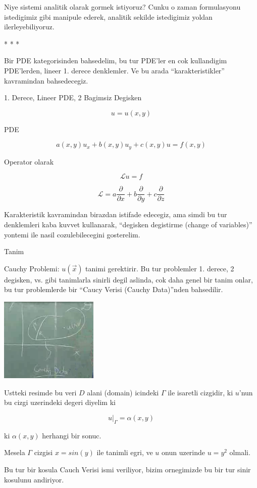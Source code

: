 \documentclass[12pt,fleqn]{article}
\begin{document}
Niye sistemi analitik olarak gormek istiyoruz? Cunku o zaman formulasyonu
istedigimiz gibi manipule ederek, analitik sekilde istedigimiz yoldan
ilerleyebiliyoruz.

* * *

Bir PDE kategorisinden bahsedelim, bu tur PDE'ler en cok kullandigim
PDE'lerden, lineer 1. derece denklemler. Ve bu arada ``karakteristikler''
kavramindan bahsedecegiz. 

1. Derece, Lineer PDE, 2 Bagimsiz Degisken

\[ u = u(x,y) \]

PDE

\[ a(x,y)u_x + b(x,y)u_y + c(x,y)u = f(x,y) \]

Operator olarak 

\[ \mathcal{L}u = f \]

\[ \mathcal{L} = a \frac{\partial }{\partial x} +
b \frac{\partial }{\partial y} +
c \frac{\partial }{\partial z} 
\]

Karakteristik kavramindan birazdan istifade edecegiz, ama simdi bu tur
denklemleri kaba kuvvet kullanarak, ``degisken degistirme (change of
variables)'' yontemi ile nasil cozulebilecegini gosterelim. 

Tanim

Cauchy Problemi: $u(\vec{x})$ tanimi gerektirir. Bu tur problemler
1. derece, 2 degisken, vs. gibi tanimlarla sinirli degil aslinda, cok daha
genel bir tanim onlar, bu tur problemlerde bir ``Caucy Verisi (Cauchy
Data)''nden bahsedilir.

\includegraphics[height=4cm]{1_11.png}

Ustteki resimde bu veri $D$ alani (domain) icindeki $\Gamma$ ile isaretli
cizgidir, ki $u$'nun bu cizgi uzerindeki degeri diyelim ki

\[ u|_{\Gamma} = \alpha(x,y) \]

ki $\alpha(x,y)$ herhangi bir sonuc. 

Mesela $\Gamma$ cizgisi $x=sin(y)$ ile tanimli egri, ve $u$ onun uzerinde
$u=y^2$ olmali.

Bu tur bir kosula Cauch Verisi ismi veriliyor, bizim ornegimizde bu bir tur
sinir kosulunu andiriyor. 
\end{document}
